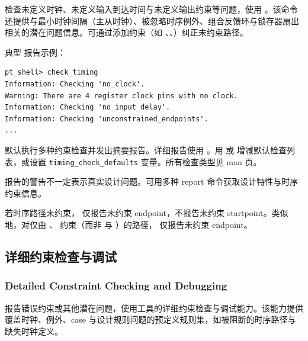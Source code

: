 检查未定义时钟、未定义输入到达时间与未定义输出约束等问题，使用 。该命令还提供与最小时钟间隔（主从时钟）、被忽略时序例外、组合反馈环与锁存器扇出相关的潜在问题信息。可通过添加约束（如 、、）纠正未约束路径。

典型  报告示例：
\begin{lstlisting}
pt_shell> check_timing
Information: Checking 'no_clock'.
Warning: There are 4 register clock pins with no clock.
Information: Checking 'no_input_delay'.
Information: Checking 'unconstrained_endpoints'.
...
\end{lstlisting}

默认执行多种约束检查并发出摘要报告。详细报告使用 。用  或  增减默认检查列表，或设置 \texttt{timing\_check\_defaults} 变量。所有检查类型见 man 页。

 报告的警告不一定表示真实设计问题。可用多种 report 命令获取设计特性与时序约束信息。


\begin{noteBox}
若时序路径未约束， 仅报告未约束 endpoint，不报告未约束 startpoint。类似地，对仅由 、 约束（而非  与 ）的路径， 仅报告未约束 endpoint。
\end{noteBox}

\subsection{详细约束检查与调试}
\subsubsection*{Detailed Constraint Checking and Debugging}

报告错误约束或其他潜在问题，使用工具的详细约束检查与调试能力。该能力提供覆盖时钟、例外、case 与设计规则问题的预定义规则集，如被阻断的时序路径与缺失时钟定义。

